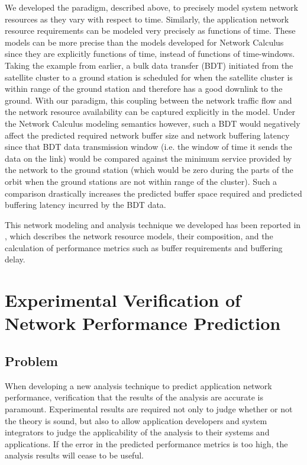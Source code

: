 We developed the \shorttool paradigm, described above, to precisely model system network resources as they vary with respect to time.  Similarly, the application network resource requirements can be modeled very precisely as functions of time.  These models can be more precise than the models developed for Network Calculus since they are explicitly functions of time, instead of functions of time-windows.  Taking the example from earlier, a bulk data transfer (BDT) initiated from the satellite cluster to a ground station is scheduled for when the satellite cluster is within range of the ground station and therefore has a good downlink to the ground.  With our paradigm, this coupling between the network traffic flow and the network resource availability can be captured explicitly in the model.  Under the Network Calculus modeling semantics however, such a BDT would negatively affect the predicted required network buffer size and network buffering latency since that BDT data transmission window (i.e. the window of time it sends the data on the link) would be compared against the minimum service provided by the network to the ground station (which would be zero during the parts of the orbit when the ground stations are not within range of the cluster).  Such a comparison drastically increases the predicted buffer space required and predicted buffering latency incurred by the BDT data. 

This network modeling and analysis technique we developed has been reported in \cite{ISIS_F6_CYPHY:14}, which describes the network resource models, their composition, and the calculation of performance metrics such as buffer requirements and buffering delay. 

\newpage
\section{Experimental Verification of Network Performance Prediction}
\label{sec:experimentalVerification}

\subsection{Problem}
When developing a new analysis technique to predict application network performance, verification that the results of the analysis are accurate is paramount.  Experimental results are required not only to judge whether or not the theory is sound, but also to allow application developers and system integrators to judge the applicability of the analysis to their systems and applications.  If the error in the predicted performance metrics is too high, the analysis results will cease to be useful.  

